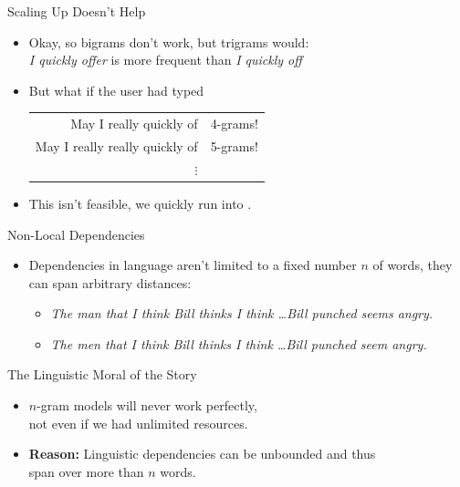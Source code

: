 \documentclass[xcolor={usenames,svgnames,x11names,dvipsnames,table}]{beamer}
\begin{document}
\begin{frame}{Scaling Up Doesn't Help}
    \begin{itemize}
        \item Okay, so bigrams don't work, but trigrams would:\\
            \emph{I quickly offer} is more frequent than \emph{I quickly off}
        \item But what if the user had typed

            \begin{center}
                \begin{tabular}{rr}
                    May I really quickly of & 4-grams!\\
                    May I really really quickly of & 5-grams!\\
                    $\vdots$
                \end{tabular}
            \end{center}
        \item This isn't feasible, we quickly run into .
    \end{itemize}
\end{frame}

\begin{frame}{Non-Local Dependencies}
    \begin{itemize}
        \item Dependencies in language aren't limited to a fixed number $n$ of words, they can span arbitrary distances:
            \begin{itemize}
                \item \emph{The man that I think Bill thinks I think \ldots Bill punched seems angry.}
                \item \emph{The men that I think Bill thinks I think \ldots Bill punched seem angry.}
            \end{itemize}
    \end{itemize}
    \begin{block}{The Linguistic Moral of the Story}
        \begin{itemize}
            \item $n$-gram models will never work perfectly,\\ not even if we had unlimited resources.
            \item \textbf{Reason:} Linguistic dependencies can be unbounded and thus\\ span over
                more than $n$ words.
        \end{itemize}
    \end{block}
\end{frame}
\end{document}
